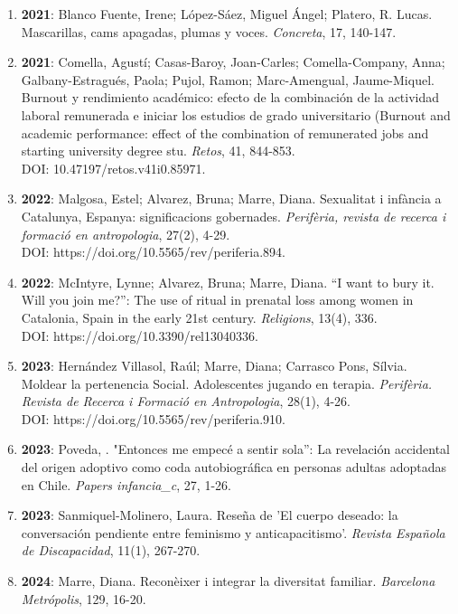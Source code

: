 \begin{enumerate}
\item {\bf 2021}: Blanco Fuente, Irene; López-Sáez, Miguel Ángel; Platero, R. Lucas.  Mascarillas, cams apagadas, plumas y voces. {\it Concreta}, 17, 140-147.  \filbreak
\item {\bf 2021}: Comella, Agustí; Casas-Baroy, Joan-Carles; Comella-Company, Anna; Galbany-Estragués, Paola; Pujol, Ramon; Marc-Amengual, Jaume-Miquel.  Burnout y rendimiento académico: efecto de la combinación de la actividad laboral remunerada e iniciar los estudios de grado universitario (Burnout and academic performance: effect of the combination of remunerated jobs and starting university degree stu. {\it Retos}, 41, 844-853.  \\ DOI: 10.47197/retos.v41i0.85971. \filbreak
\item {\bf 2022}: Malgosa, Estel; Alvarez, Bruna; Marre, Diana.  Sexualitat i infància a Catalunya, Espanya: significacions gobernades. {\it Perifèria, revista de recerca i formació en antropologia}, 27(2), 4-29.  \\ DOI: https://doi.org/10.5565/rev/periferia.894. \filbreak
\item {\bf 2022}: McIntyre, Lynne; Alvarez, Bruna; Marre, Diana.  “I want to bury it. Will you join me?”: The use of ritual in prenatal loss among women in Catalonia, Spain in the early 21st century. {\it Religions}, 13(4), 336.  \\ DOI: https://doi.org/10.3390/rel13040336. \filbreak
\item {\bf 2023}: Hernández Villasol, Raúl; Marre, Diana; Carrasco Pons, Sílvia.  Moldear la pertenencia Social. Adolescentes jugando en terapia. {\it Perifèria. Revista de Recerca i  Formació en Antropologia}, 28(1), 4-26.  \\ DOI: https://doi.org/10.5565/rev/periferia.910. \filbreak
\item {\bf 2023}: Poveda, .  "Entonces me empecé a sentir sola”: La revelación accidental del origen adoptivo como coda autobiográfica en personas adultas adoptadas en Chile. {\it Papers infancia\_c}, 27, 1-26.  \filbreak
\item {\bf 2023}: Sanmiquel-Molinero, Laura.  Reseña de 'El cuerpo deseado: la conversación pendiente entre feminismo y anticapacitismo'. {\it Revista Española de Discapacidad}, 11(1), 267-270.  \filbreak
\item {\bf 2024}: Marre, Diana.  Reconèixer i integrar la diversitat familiar. {\it Barcelona Metrópolis}, 129, 16-20.  \filbreak
\end{enumerate} 
